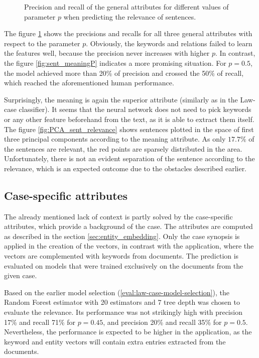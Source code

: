 \documentclass[
  digital, %
  notable,   %
  nolof,     %
  nolot,     %
]{fithesis3}
\begin{document}
\begin{figure}[H]
\begin{subfigure}{.5\textwidth}
\end{subfigure}
\caption{Precision and recall of the general attributes for different values of parameter $p$ when predicting the relevance of sentences.}
\label{fig:sent_PandR}
\end{figure}

\newpage
The figure \ref{fig:sent_PandR} shows the precisions and recalls for all three general attributes with respect to the parameter $p$.
Obviously, the keywords and relations failed to learn the features well, because the precision never increases with higher $p$.
In contrast, the figure \ref{fig:sent_meaningP} indicates a more promising situation.
For $p=0.5$, the model achieved more than 20\% of precision and crossed the 50\% of recall, which reached the aforementioned human performance.


Surprisingly, the meaning is again the superior attribute (similarly as in the Law-case classifier).
It seems that the neural network does not need to pick keywords or any other feature beforehand from the text, as it is able to extract them itself.
The figure \ref{fig:PCA_sent_relevance} shows sentences plotted in the space of first three principal components according to the meaning attribute.
As only $17.7\%$ of the sentences are relevant, the red points are sparsely distributed in the area. Unfortunately, there is not an evident separation of the sentence according to the relevance, which is an expected outcome due to the obstacles described earlier.


\subsection{Case-specific attributes}
The already mentioned lack of context is partly solved by the case-specific attributes, which provide a background of the case.
The attributes are computed as described in the section \ref{sec:entity_embedding}.
Only the case synopsis is applied in the creation of the vectors, in contrast with the application, where the vectors are complemented with keywords from documents.
The prediction is evaluated on models that were trained exclusively on the documents from the given case.

Based on the earlier model selection (\ref{eval:law-case-model-selection}), the Random Forest estimator with 20 estimators and 7 tree depth was chosen to evaluate the relevance.
Its performance was not strikingly high with precision 17\% and recall 71\% for $p=0.45$, and precision 20\% and recall 35\% for $p=0.5$.
Nevertheless, the performance is expected to be higher in the application, as the keyword and entity vectors will contain extra entries extracted from the documents.
\end{document}
